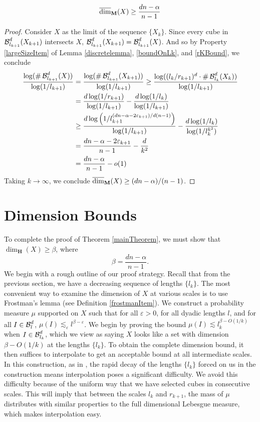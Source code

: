 \begin{lemma}
	\[ \operatorname{\overline{\dim}_{\mathbf{M}}}(X) \geq \frac{dn - \alpha}{n - 1} \]
\end{lemma}
\begin{proof}
	Consider $X$ as the limit of the sequence $\{ X_k \}$. Since every cube in $\operatorname{\mathcal{B}}^d_{l_{k+1}}(X_{k+1})$ intersects $X$, $\operatorname{\mathcal{B}}^d_{l_{k+1}}(X_{k+1}) = \operatorname{\mathcal{B}}^d_{l_{k+1}}(X)$. And so by Property \ref{largeSizeItem} of Lemma \ref{discretelemma}, \eqref{boundOnLk}, and \eqref{rKBound}, we conclude
	\begin{align*}
		\frac{\log(\# \operatorname{\mathcal{B}}^d_{l_{k+1}}(X))}{\log(1/l_{k+1})} &= \frac{\log(\# \operatorname{\mathcal{B}}^d_{l_{k+1}}(X_{k+1}))}{\log(1/l_{k+1})} \geq \frac{\log((l_k/r_{k+1})^d \cdot \# \operatorname{\mathcal{B}}^d_{l_k}(X_k))}{\log(1/l_{k+1})}\\
		&= \frac{d \log(1/r_{k+1})}{\log(1/l_{k+1})} - \frac{d \log(1/l_k)}{\log(1/l_{k+1})}\\
		&\geq \frac{d \log \left(1/l_{k+1}^{(dn - \alpha - 2\varepsilon_{k+1})/d(n-1)} \right)}{\log(1/l_{k+1})} - \frac{d \log(1/l_k)}{\log(1/l_k^{k^2})}\\
		&= \frac{dn - \alpha - 2\varepsilon_{k+1}}{n-1} - \frac{d}{k^2}\\
		&= \frac{dn - \alpha}{n-1} - o(1)
	\end{align*}
	Taking $k \to \infty$, we conclude $\operatorname{\overline{\dim}_{\mathbf{M}}}(X) \geq (dn - \alpha)/(n-1)$.
\end{proof}







\section{Dimension Bounds}\label{dimensionsection}

To complete the proof of Theorem \ref{mainTheorem}, we must show that $\dim_{\mathbf{H}}(X) \geq \beta$, where
%
\[ \beta = \frac{dn - \alpha}{n - 1}. \]
%
We begin with a rough outline of our proof strategy. Recall that from the previous section, we have a decreasing sequence of lengths $\{ l_k \}$. The most convenient way to examine the dimension of $X$ at various scales is to use Frostman's lemma (see Definition \ref{frostmanItem}). We construct a probability measure $\mu$ supported on $X$ such that for all $\varepsilon > 0$, for all dyadic lengths $l$, and for all $I \in \operatorname{\mathcal{B}}^d_l$, $\mu(I) \lesssim_\varepsilon l^{\beta - \varepsilon}$. We begin by proving the bound $\mu(I) \lesssim l_k^{\beta - O(1/k)}$ when $I \in \operatorname{\mathcal{B}}^d_{l_k}$, which we view as saying $X$ looks like a set with dimension $\beta - O(1/k)$ at the lengths $\{ l_k \}$. To obtain the complete dimension bound, it then suffices to interpolate to get an acceptable bound at all intermediate scales. In this construction, as in \cite{MalabikaRob}, the rapid decay of the lengths $\{ l_k \}$ forced on us in the construction means interpolation poses a significant difficulty. We avoid this difficulty because of the uniform way that we have selected cubes in consecutive scales. This will imply that between the scales $l_k$ and $r_{k+1}$, the mass of $\mu$ distributes with similar properties to the full dimensional Lebesgue measure, which makes interpolation easy.

